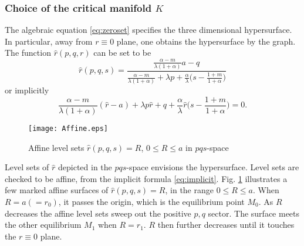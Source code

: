 \documentclass[a4paper,11pt]{article}
\theoremstyle{remark}
\begin{document}
\subsubsection{Choice of the critical manifold $K$}
The algebraic equation \eqref{eq:zeroset} specifies the three dimensional hypersurface. In particular, away from $r\equiv0$ plane, one obtains the hypersurface by the graph. The function $\hat{r}(p,q,r)$ can be set to be
\begin{equation*}
\hat{r}(p,q,s) = \frac{ \frac{\alpha-m}{\lambda(1+\alpha)}a - q }{  \frac{\alpha-m}{\lambda(1+\alpha)} + \lambda p + \frac{\alpha}{\lambda}\big(s- \frac{1+m}{1+\alpha}\big)}
\end{equation*}
or implicitly
\begin{equation}
\frac{\alpha-m}{\lambda(1+\alpha)}(\hat{r}-a) + \lambda p\hat{r} + q +\frac{\alpha}{\lambda}\hat{r}\big(s- \frac{1+m}{1+\alpha}\big)=0. \label{eq:implicit}
\end{equation}

\begin{figure}[ht]
 \centering
%
  \texttt{[image: Affine.eps]}
  \caption{Affine level sets $\hat{r}(p,q,s)=R$, $0\le R\le a$  in $pqs$-space} \label{fig:affine}
\end{figure}

Level sets of $\hat{r}$ depicted in the $pqs$-space envisions the hypersurface. Level sets are checked to be affine, from the implicit formula \eqref{eq:implicit}. Fig. \ref{fig:affine} illustrates a few marked affine surfaces of $\hat{r}(p,q,s)=R$, in the range $0\le R\le a$. When $R=a(=r_0)$, it passes the origin, which is the equilibrium point $M_0$. As $R$ decreases the affine level sets sweep out the positive $p,q$ sector. The surface meets the other equilibrium $M_1$ when $R=r_1$. $R$ then further decreases until it touches the $r\equiv0$ plane.
\end{document}

